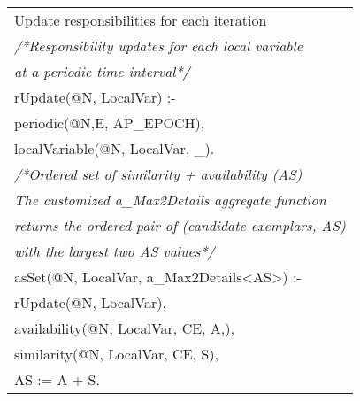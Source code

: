 \documentclass[letterpaper,twocolumn,11pt]{article}
\begin{document}
\begin{tabular}{|l|}
\hline
\rowcolor{myblue} Update responsibilities for each iteration\\
\scriptsize{\textit{/*Responsibility updates for each local variable}}\\
\scriptsize{\textit{at a periodic time interval*/}}\\
\scriptsize{rUpdate(@N, LocalVar) :-}\\
\scriptsize{ \hspace{0.5cm}        periodic(@N,E, AP\_EPOCH),}\\
\scriptsize{ \hspace{0.5cm}        localVariable(@N, LocalVar, \_).}\\
        
\scriptsize{\textit{/*Ordered set of similarity + availability (AS)}}\\
\scriptsize{\textit{The customized a\_Max2Details aggregate function}}\\
\scriptsize{\textit{returns the ordered pair of (candidate exemplars, AS)}}\\
\scriptsize{\textit{with the largest two AS values*/}}\\
\scriptsize{asSet(@N, LocalVar, a\_Max2Details\textless{}AS\textgreater{}) :- }\\
\scriptsize{ \hspace{0.5cm}        rUpdate(@N, LocalVar),}\\
\scriptsize{ \hspace{0.5cm}        availability(@N, LocalVar, CE, A,),}\\
\scriptsize{ \hspace{0.5cm}        similarity(@N, LocalVar, CE, S),}\\
\scriptsize{ \hspace{0.5cm}        AS := A + S.}\\



\end{tabular}
\end{document}
